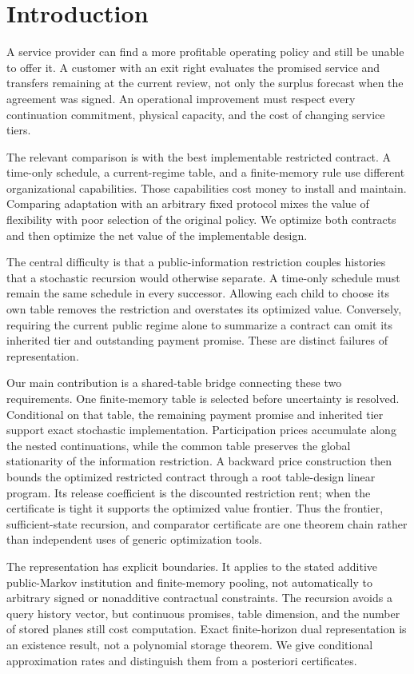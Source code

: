 \documentclass[11pt,letterpaper]{article}
\theoremstyle{definition}\newtheorem{assumption}[theorem]{Assumption}
\begin{document}
\section{Introduction}
A service provider can find a more profitable operating policy and still be unable to offer it. A customer with an exit right evaluates the promised service and transfers remaining at the current review, not only the surplus forecast when the agreement was signed. An operational improvement must respect every continuation commitment, physical capacity, and the cost of changing service tiers.

The relevant comparison is with the best implementable restricted contract. A time-only schedule, a current-regime table, and a finite-memory rule use different organizational capabilities. Those capabilities cost money to install and maintain. Comparing adaptation with an arbitrary fixed protocol mixes the value of flexibility with poor selection of the original policy. We optimize both contracts and then optimize the net value of the implementable design.

The central difficulty is that a public-information restriction couples histories that a stochastic recursion would otherwise separate. A time-only schedule must remain the same schedule in every successor. Allowing each child to choose its own table removes the restriction and overstates its optimized value. Conversely, requiring the current public regime alone to summarize a contract can omit its inherited tier and outstanding payment promise. These are distinct failures of representation.

Our main contribution is a shared-table bridge connecting these two requirements. One finite-memory table is selected before uncertainty is resolved. Conditional on that table, the remaining payment promise and inherited tier support exact stochastic implementation. Participation prices accumulate along the nested continuations, while the common table preserves the global stationarity of the information restriction. A backward price construction then bounds the optimized restricted contract through a root table-design linear program. Its release coefficient is the discounted restriction rent; when the certificate is tight it supports the optimized value frontier. Thus the frontier, sufficient-state recursion, and comparator certificate are one theorem chain rather than independent uses of generic optimization tools.

The representation has explicit boundaries. It applies to the stated additive public-Markov institution and finite-memory pooling, not automatically to arbitrary signed or nonadditive contractual constraints. The recursion avoids a query history vector, but continuous promises, table dimension, and the number of stored planes still cost computation. Exact finite-horizon dual representation is an existence result, not a polynomial storage theorem. We give conditional approximation rates and distinguish them from a posteriori certificates.
\end{document}
